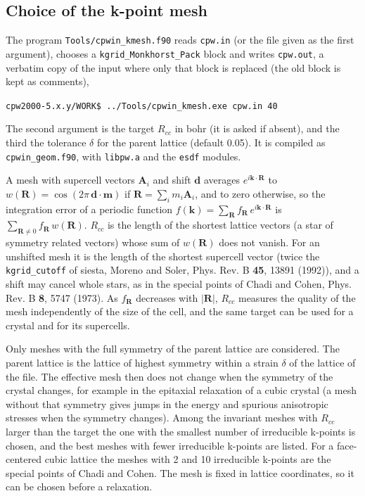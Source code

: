 \documentclass[11pt]{article}
\begin{document}
\subsection{Choice of the k-point mesh}
\label{sec:kmesh}

The program \texttt{Tools/cpwin\_kmesh.f90} reads \texttt{cpw.in} (or the file given as the
first argument), chooses a \texttt{kgrid\_Monkhorst\_Pack} block and writes \texttt{cpw.out},
a verbatim copy of the input where only that block is replaced (the old block is kept as comments),

\noindent\texttt{cpw2000-5.x.y/WORK\$ ../Tools/cpwin\_kmesh.exe cpw.in 40}

\noindent The second argument is the target $R_{cc}$ in bohr (it is asked if absent), and the third
the tolerance $\delta$ for the parent lattice (default 0.05).  It is compiled as
\texttt{cpwin\_geom.f90}, with \texttt{libpw.a} and the \texttt{esdf} modules.

A mesh with supercell vectors $\mathbf{A}_i$ and shift $\mathbf{d}$ averages
$e^{i\mathbf{k}\cdot\mathbf{R}}$ to
$w(\mathbf{R}) = \cos(2\pi\, \mathbf{d}\cdot\mathbf{m})$ if $\mathbf{R} = \sum_i m_i \mathbf{A}_i$,
and to zero otherwise, so the integration error of a periodic function
$f(\mathbf{k}) = \sum_{\mathbf{R}} f_{\mathbf{R}}\, e^{i\mathbf{k}\cdot\mathbf{R}}$ is
$\sum_{\mathbf{R}\neq 0} f_{\mathbf{R}}\, w(\mathbf{R})$.
$R_{cc}$ is the length of the shortest lattice vectors (a star of symmetry related vectors)
whose sum of $w(\mathbf{R})$ does not vanish.  For an unshifted mesh it is the length of the
shortest supercell vector (twice the \texttt{kgrid\_cutoff} of {\sc siesta}, Moreno and Soler,
Phys. Rev. B {\bf 45}, 13891 (1992)), and a shift may cancel whole stars, as in the special
points of Chadi and Cohen, Phys. Rev. B {\bf 8}, 5747 (1973).  As $f_{\mathbf{R}}$ decreases
with $|\mathbf{R}|$, $R_{cc}$ measures the quality of the mesh independently of the size of
the cell, and the same target can be used for a crystal and for its supercells.

Only meshes with the full symmetry of the parent lattice are considered.  The parent lattice is
the lattice of highest symmetry within a strain $\delta$ of the lattice of the file.  The
effective mesh then does not change when the symmetry of the crystal changes, for example in the
epitaxial relaxation of a cubic crystal (a mesh without that symmetry gives jumps in the energy
and spurious anisotropic stresses when the symmetry changes).  Among the invariant meshes with
$R_{cc}$ larger than the target the one with the smallest number of irreducible k-points is
chosen, and the best meshes with fewer irreducible k-points are listed.  For a face-centered cubic
lattice the meshes with 2 and 10 irreducible k-points are the special points of Chadi and Cohen.
The mesh is fixed in lattice coordinates, so it can be chosen before a relaxation.
\end{document}
